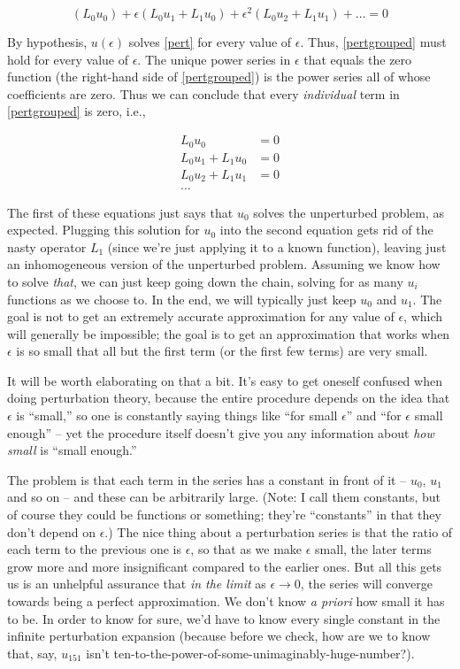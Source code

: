 \documentclass[11pt]{book}
\begin{document}
\begin{equation}(L_0 u_0) + \epsilon(L_0 u_1 + L_1 u_0) + \epsilon^2(L_0 u_2 + L_1 u_1) + \ldots = 0 \label{pertgrouped}\end{equation}

By hypothesis, $u(\epsilon)$ solves \eqref{pert} for every value of $\epsilon$.  Thus, \eqref{pertgrouped} must hold for every value of $\epsilon$.  The unique power series in $\epsilon$ that equals the zero function (the right-hand side of \eqref{pertgrouped}) is the power series all of whose coefficients are zero.  Thus we can conclude that every \emph{individual} term in \eqref{pertgrouped} is zero, i.e.,

\begin{align}L_0 u_0 &= 0 \\ L_0u_1 + L_1u_0 &= 0  \\ L_0u_2 + L_1u_1 &= 0 \\ \ldots \end{align}

The first of these equations just says that $u_0$ solves the unperturbed problem, as expected.  Plugging this solution for $u_0$ into the second equation gets rid of the nasty operator $L_1$ (since we're just applying it to a known function), leaving just an inhomogeneous version of the unperturbed problem.  Assuming we know how to solve \emph{that}, we can just keep going down the chain, solving for as many $u_i$ functions as we choose to.  In the end, we will typically just keep $u_0$ and $u_1$.  The goal is not to get an extremely accurate approximation for any value of $\epsilon$, which will generally be impossible; the goal is to get an approximation that works when $\epsilon$ is so small that all but the first term (or the first few terms) are very small.

It will be worth elaborating on that a bit.  It's easy to get oneself confused when doing perturbation theory, because the entire procedure depends on the idea that $\epsilon$ is ``small,'' so one is constantly saying things like ``for small $\epsilon$'' and ``for $\epsilon$ small enough'' -- yet the procedure itself doesn't give you any information about \emph{how small} is ``small enough.''

The problem is that each term in the series has a constant in front of it -- $u_0$, $u_1$ and so on -- and these can be arbitrarily large.  (Note: I call them constants, but of course they could be functions or something; they're ``constants'' in that they don't depend on $\epsilon$.)  The nice thing about a perturbation series is that the ratio of each term to the previous one is $\epsilon$, so that as we make $\epsilon$ small, the later terms grow more and more insignificant compared to the earlier ones.  But all this gets us is an unhelpful assurance that \emph{in the limit} as $\epsilon \rightarrow 0$, the series will converge towards being a perfect approximation.  We don't know \emph{a priori} how small it has to be.  In order to know for sure, we'd have to know every single constant in the infinite perturbation expansion (because before we check, how are we to know that, say, $u_{151}$ isn't ten-to-the-power-of-some-unimaginably-huge-number?).
\end{document}
